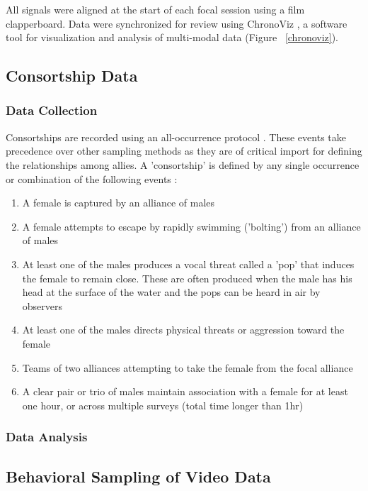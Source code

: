 \documentclass[11pt]{amsart}
\begin{document}
\noindent All signals were aligned at the start of each focal session using a film clapperboard. Data were synchronized for review using ChronoViz \citep{fouse:2011}, a software tool for visualization and analysis of multi-modal data (Figure ~\ref{chronoviz}). 

\subsection{Consortship Data}
\subsubsection{Data Collection}
Consortships are recorded using an all-occurrence protocol \citep{altmann:1974}. These events take precedence over other sampling methods as they are of critical import for defining the relationships among allies. A 'consortship' is defined by any single occurrence or combination of the following events \citep{connor:1996a}: 

\begin{enumerate}
\item A female is captured by an alliance of males
\item A female attempts to escape by rapidly swimming ('bolting') from an alliance of males
\item At least one of the males produces a vocal threat called a 'pop' that induces the female to remain close. These are often produced when the male has his head at the surface of the water and the pops can be heard in air by observers \citep{connor:1996b}
\item At least one of the males directs physical threats or aggression toward the female
\item Teams of two alliances attempting to take the female from the focal alliance \citep{connor:1992a, connor:1992b}
\item A clear pair or trio of males maintain association with a female for at least one hour, or across multiple surveys (total time longer than 1hr) %
\end{enumerate}

\subsubsection{Data Analysis}

\subsection{Behavioral Sampling of Video Data}
\end{document}
